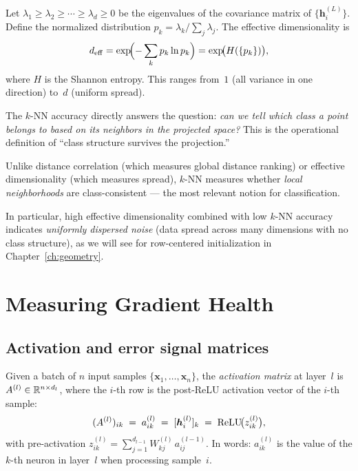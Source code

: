 \begin{definition}
Let $\lambda_1 \geq \lambda_2 \geq \cdots \geq \lambda_d \geq 0$ be
the eigenvalues of the covariance matrix of $\{\bm{h}_i^{(L)}\}$.
Define the normalized distribution
$p_k = \lambda_k / \sum_j \lambda_j$.  The effective dimensionality is
\begin{equation}\label{eq:effdim}
  d_{\mathrm{eff}}
  = \exp\!\Bigl(-\sum_{k} p_k \ln p_k\Bigr)
  = \exp\!\bigl(H(\{p_k\})\bigr),
\end{equation}
where $H$ is the Shannon entropy.  This ranges from~$1$ (all variance
in one direction) to~$d$ (uniform spread).
\end{definition}

\begin{remark}
\label{rem:knn_primary}
The $k$-NN accuracy directly answers the question:
\emph{can we tell which class a point belongs to based on its
neighbors in the projected space?}  This is the operational definition
of ``class structure survives the projection.''

Unlike distance correlation (which measures global distance ranking)
or effective dimensionality (which measures spread), $k$-NN measures
whether \emph{local neighborhoods} are class-consistent --- the
most relevant notion for classification.

In particular, high effective dimensionality combined with low
$k$-NN accuracy indicates \emph{uniformly dispersed noise}
(data spread across many dimensions with no class structure),
as we will see for row-centered initialization in
Chapter~\ref{ch:geometry}.
\end{remark}

\section{Measuring Gradient Health}
\label{sec:gradient_health}

\subsection{Activation and error signal matrices}

\begin{definition}
\label{def:activation_matrix}
Given a batch of $n$ input samples $\{\bm{x}_1, \dots, \bm{x}_n\}$,
the \emph{activation matrix} at layer~$l$ is
$A^{(l)} \in \mathbb{R}^{n \times d_l}$, where the $i$-th row is the
post-ReLU activation vector of the $i$-th sample:
\[
  (A^{(l)})_{ik} \;=\; a^{(l)}_{ik}
  \;=\; [\bm{h}^{(l)}_i]_k
  \;=\; \operatorname{ReLU}\!\bigl(z^{(l)}_{ik}\bigr),
\]
with pre-activation
$z^{(l)}_{ik} = \sum_{j=1}^{d_{l-1}} W^{(l)}_{kj}\, a^{(l-1)}_{ij}$.
In words: $a^{(l)}_{ik}$ is the value of the $k$-th neuron in
layer~$l$ when processing sample~$i$.
\end{definition}

